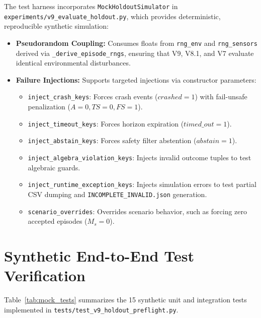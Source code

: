 \documentclass[10pt,a4paper]{article}
\begin{document}
The test harness incorporates \texttt{MockHoldoutSimulator} in \texttt{experiments/v9\_evaluate\_holdout.py}, which provides deterministic, reproducible synthetic simulation:
\begin{itemize}
    \item \textbf{Pseudorandom Coupling:} Consumes floats from \texttt{rng\_env} and \texttt{rng\_sensors} derived via \texttt{\_derive\_episode\_rngs}, ensuring that V9, V8.1, and V7 evaluate identical environmental disturbances.
    \item \textbf{Failure Injections:} Supports targeted injections via constructor parameters:
    \begin{itemize}
        \item \texttt{inject\_crash\_keys}: Forces crash events ($crashed=1$) with fail-unsafe penalization ($A=0, TS=0, FS=1$).
        \item \texttt{inject\_timeout\_keys}: Forces horizon expiration ($timed\_out=1$).
        \item \texttt{inject\_abstain\_keys}: Forces safety filter abstention ($abstain=1$).
        \item \texttt{inject\_algebra\_violation\_keys}: Injects invalid outcome tuples to test algebraic guards.
        \item \texttt{inject\_runtime\_exception\_keys}: Injects simulation errors to test partial CSV dumping and \texttt{INCOMPLETE\_INVALID.json} generation.
        \item \texttt{scenario\_overrides}: Overrides scenario behavior, such as forcing zero accepted episodes ($M_s=0$).
    \end{itemize}
\end{itemize}

\section{Synthetic End-to-End Test Verification}

Table~\ref{tab:mock_tests} summarizes the 15 synthetic unit and integration tests implemented in \texttt{tests/test\_v9\_holdout\_preflight.py}.
\end{document}
